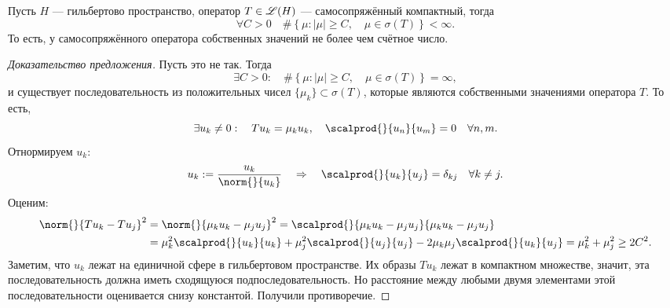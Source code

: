 \begin{prop} Пусть $H$ --- гильбертово пространство, оператор $T \in \mathscr{L}(H)$ --- самосопряжённый компактный, тогда
$$ \forall C > 0 \quad \# \left\{ \mu : | \mu | \geq C, \quad \mu \in \sigma(T) \right\} < \infty.$$
То есть, у самосопряжённого оператора собственных значений не более чем счётное число.
\end{prop}
\begin{proof}[Доказательство предложения]
Пусть это не так. Тогда
$$ \exists C > 0 : \quad \#\left\{ \mu : | \mu | \geq C, \quad \mu \in \sigma(T) \right\} = \infty,$$
и существует последовательность из положительных чисел $\{ \mu_k \} \subset \sigma(T)$, которые являются собственными значениями оператора $T$. То есть,
$$ \exists u_k \neq 0 : \quad T u_k = \mu_k u_k, \quad \scalprod{}{u_n}{u_m} = 0 \quad \forall n,m. $$ Отнормируем $u_k$:
$$ u_k := \frac {u_k}{\norm{}{u_k}} \quad \Rightarrow \quad \scalprod{}{u_k}{u_j} = \delta_{kj} \quad \forall k \neq j.$$
Оценим:
\begin{align*}
\norm{}{Tu_k - Tu_j}^2 &= \norm{}{\mu_k u_k - \mu_j u_j}^2 = \scalprod{}{\mu_k u_k - \mu_j u_j}{\mu_k u_k - \mu_j u_j} \\
&= \mu_k^2 \scalprod{}{u_k}{u_k} + \mu_j^2 \scalprod{}{u_j}{u_j} - 2 \mu_k \mu_j \scalprod{}{u_k}{u_j} = \mu_k^2 + \mu_j^2 \geq 2C^2.
\end{align*}
Заметим, что $u_k$ лежат на единичной сфере в гильбертовом пространстве. Их образы $Tu_k$ лежат в компактном множестве, значит, эта последовательность должна иметь сходящуюся подпоследовательность. Но расстояние между любыми двумя элементами этой последовательности оценивается снизу константой. Получили противоречие.

\end{proof}

